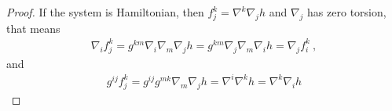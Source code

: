 \begin{proof}
    If the system is Hamiltonian, then $f^k_j = \nabla^k \nabla_j h$ and $\nabla_j$ has zero torsion, that means
    \begin{align}
        \nabla_i f^k_j = g^{km} \nabla_i \nabla_m \nabla_j h = g^{km} \nabla_j \nabla_m \nabla_i h = \nabla_j f^{k}_i \:,
    \end{align}
    and
    \begin{align}
        g^{ij} f^{k}_j = g^{ij} g^{mk} \nabla_m \nabla_j h = \nabla^i \nabla^k h = \nabla^k \nabla_i h
    \end{align}
\end{proof}
